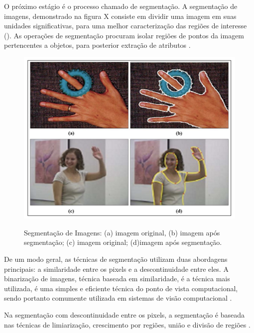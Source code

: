 O próximo estágio é o processo chamado de segmentação. A segmentação de imagens, demonstrado na figura X consiste em dividir uma imagem em suas unidades significativas, para uma melhor caracterização das regiões de interesse (). As operações de segmentação procuram isolar regiões de pontos da imagem pertencentes a objetos, para posterior extração de atributos \cite{Lourdes2010}.
 \begin{figure}[h]
	\centering
	\includegraphics[width=1.0\textwidth]{Imagens/segmentacao} %
	\caption[Segmentação de Imagens: (a) imagem original, (b) imagem após segmentação; (c) imagem original; (d)imagem após segmentação.]{Segmentação de Imagens: (a) imagem original, (b) imagem após segmentação; (c) imagem original; (d)imagem após segmentação.}
	\label{fig:tux_laplace}
\end{figure}
De um modo geral, as técnicas de segmentação utilizam duas abordagens principais: a similaridade entre os pixels e a descontinuidade entre eles. A binarização de imagens, técnica baseada em similaridade, é a técnica mais utilizada, é uma  simples e eficiente técnica do ponto de vista computacional, sendo portanto comumente utilizada em sistemas de visão computacional \cite{ISRAEL2003}.

Na segmentação com descontinuidade entre os pixels, a segmentação é baseada nas técnicas de limiarização, crescimento por regiões, união e divisão de regiões \cite{Rodrigues2002}.

